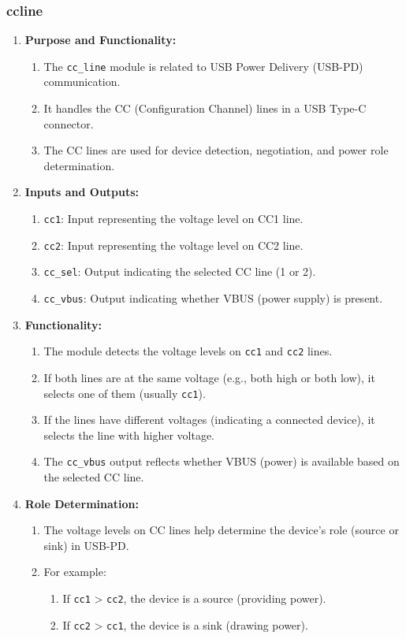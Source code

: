 \subsubsection{cc\textunderscore line}
\begin{enumerate}
    \item \textbf{Purpose and Functionality:}
    \begin{enumerate}
        \item The \texttt{cc\_line} module is related to USB Power Delivery (USB-PD) communication.
        \item It handles the CC (Configuration Channel) lines in a USB Type-C connector.
        \item The CC lines are used for device detection, negotiation, and power role determination.
    \end{enumerate}

    \item \textbf{Inputs and Outputs:}
    \begin{enumerate}
        \item \texttt{cc1}: Input representing the voltage level on CC1 line.
        \item \texttt{cc2}: Input representing the voltage level on CC2 line.
        \item \texttt{cc\_sel}: Output indicating the selected CC line (1 or 2).
        \item \texttt{cc\_vbus}: Output indicating whether VBUS (power supply) is present.
    \end{enumerate}

    \item \textbf{Functionality:}
    \begin{enumerate}
        \item The module detects the voltage levels on \texttt{cc1} and \texttt{cc2} lines.
        \item If both lines are at the same voltage (e.g., both high or both low), it selects one of them (usually \texttt{cc1}).
        \item If the lines have different voltages (indicating a connected device), it selects the line with higher voltage.
        \item The \texttt{cc\_vbus} output reflects whether VBUS (power) is available based on the selected CC line.
    \end{enumerate}

    \item \textbf{Role Determination:}
    \begin{enumerate}
        \item The voltage levels on CC lines help determine the device’s role (source or sink) in USB-PD.
        \item For example:
        \begin{enumerate}
            \item If \texttt{cc1} > \texttt{cc2}, the device is a source (providing power).
            \item If \texttt{cc2} > \texttt{cc1}, the device is a sink (drawing power).
        \end{enumerate}
    \end{enumerate}


\end{enumerate}
